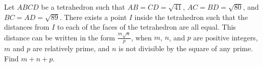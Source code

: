 Let $ABCD$ be a tetrahedron such that $AB = CD = \sqrt{41}$, $AC = BD = \sqrt{80}$, and $BC = AD = \sqrt{89}$. There exists a point $I$ inside the tetrahedron such that the distances from $I$ to each of the faces of the tetrahedron are all equal. This distance can be written in the form $\frac{m \sqrt{n}}{p}$, when $m$, $n$, and $p$ are positive integers, $m$ and $p$ are relatively prime, and $n$ is not divisible by the square of any prime. Find $m+n+p$.
